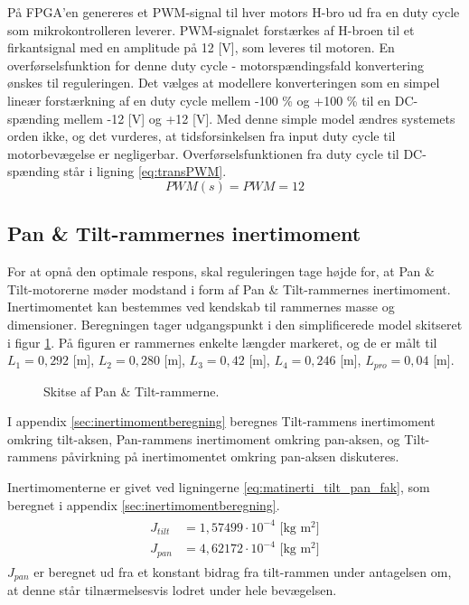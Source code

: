 På FPGA'en genereres et PWM-signal til hver motors H-bro ud fra en
duty cycle som mikrokontrolleren leverer.
PWM-signalet forstærkes af H-broen til et firkantsignal med en amplitude på 12 [V],
som leveres til motoren.
En overførselsfunktion for denne duty cycle - motorspændingsfald konvertering ønskes
til reguleringen.
Det vælges at modellere konverteringen som en simpel lineær forstærkning af en duty cycle mellem -100 \% og +100 \%
til en DC-spænding mellem -12 [V] og +12 [V]. Med denne simple model ændres systemets orden ikke,
og det vurderes, at tidsforsinkelsen fra input duty cycle til motorbevægelse er negligerbar.
Overførselsfunktionen fra duty cycle til DC-spænding står i ligning \ref{eq:transPWM}.
\begin{equation}
	PWM\left(s\right)=PWM=12
	\label{eq:transPWM}
\end{equation}

\subsection{Pan \& Tilt-rammernes inertimoment}
\label{sec:inertimoment}
For at opnå den optimale respons, skal reguleringen tage højde for, at Pan \& Tilt-motorerne møder modstand i form af
Pan \& Tilt-rammernes inertimoment. Inertimomentet kan bestemmes ved kendskab til rammernes
masse og dimensioner. Beregningen tager udgangspunkt i den simplificerede model skitseret i figur \ref{fig:inerti_PTS}.
På figuren er rammernes enkelte længder markeret, og de er målt til \({L_{1}} =0,292\) [m],
\({L_{2}} =0,280\) [m], \({L_{3}}= 0,42\) [m], \({L_{4}} =0,246\) [m], \({L_{pro}}=0,04\) [m].
\begin{figure}[!th]
\centering
\begin{tikzpicture}[scale=0.8]

\end{tikzpicture}
\caption[Skitse af Pan \& Tilt-rammerne]{Skitse af Pan \& Tilt-rammerne.}
\label{fig:inerti_PTS}
\end{figure}

I appendix \ref{sec:inertimomentberegning} beregnes Tilt-rammens inertimoment omkring tilt-aksen,
Pan-rammens inertimoment omkring pan-aksen,
og Tilt-rammens påvirkning på inertimomentet omkring pan-aksen diskuteres.

Inertimomenterne er givet ved ligningerne \ref{eq:matinerti_tilt_pan_fak},
som beregnet i appendix \ref{sec:inertimomentberegning}.
\begin{align}
\label{eq:matinerti_tilt_pan_fak}
\begin{split}
{J_{tilt}}&=1,57499\cdot{10}^{-4} \text{ [kg m$^2$]}
\\
{J_{pan}}&=4,62172\cdot{10}^{-4} \text{ [kg m$^2$]}
\end{split}
\end{align}
\(J_{pan}\) er beregnet ud fra et konstant bidrag fra tilt-rammen under antagelsen om,
at denne står tilnærmelsesvis lodret under hele bevægelsen.

